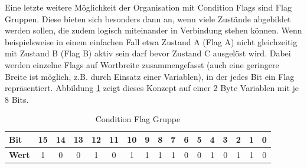 \documentclass{llncs}
\begin{document}
Eine letzte weitere Möglichkeit der Organisation mit Condition Flags sind Flag Gruppen. Diese bieten sich besonders dann an, wenn viele Zustände abgebildet werden sollen, die zudem logisch miteinander in Verbindung stehen können. Wenn beispielsweise in einem einfachen Fall etwa Zustand A (Flag A) nicht gleichzeitig mit Zustand B (Flag B) aktiv sein darf bevor Zustand C ausgelöst wird. Dabei werden einzelne Flags auf Wortbreite zusammengefasst (auch eine geringere Breite ist möglich, z.B. durch Einsatz einer Variablen), in der jedes Bit ein Flag repräsentiert. Abbildung \ref{tab:FlagGroup} zeigt dieses Konzept auf einer 2 Byte Variablen mit je 8 Bits.\\
\begin{table}[h]
	\centering %
	\def\arraystretch{1.5} %
	\setlength{\tabcolsep}{0.5em} %
		\begin{tabular}[h]{|l|c|c|c|c|c|c|c|c|c|c|c|c|c|c|c|c|}
			\hline
			\textbf{Bit} & \cellcolor{hellgrau}15 & \cellcolor{hellgrau}14 & \cellcolor{hellgrau}13 & \cellcolor{hellgrau}12 & \cellcolor{hellgrau}11 & \cellcolor{hellgrau}10 & \cellcolor{hellgrau}9 & \cellcolor{hellgrau}8 & \cellcolor{hellgrau}7 & \cellcolor{hellgrau}6 & \cellcolor{hellgrau}5 & \cellcolor{hellgrau}4 & \cellcolor{hellgrau}3 & \cellcolor{hellgrau}2 & \cellcolor{hellgrau}1 & \cellcolor{hellgrau}0 \\
			\hline
			\textbf{Wert} & 1 & 0 & 0 & 1 & 0 & 1 & 1 & 1 & 1 & 0 & 0 & 1 & 0 & 1 & 1 & 0 \\
			\hline
	\end{tabular}%
	\caption{\label{tab:FlagGroup} Condition Flag Gruppe \autocite[vgl.][85]{Cooling2017}}
\end{table}
\end{document}
